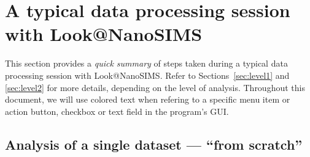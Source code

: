 \documentclass[a4paper, 11pt]{article}
\newcommand{\ttt}[1]{\texttt{#1}}
\newcommand{\lans}[1]{{\color{magenta}#1}}
\newcommand{\lanscb}[1]{{\color{darkgreen}#1}}
\newcommand{\lanstf}[1]{{\color{cyan}#1}}
\newcounter{step}
\begin{document}

\clearpage

\section{A typical data processing session with Look@NanoSIMS}

This section provides a \emph{quick summary} of steps taken during a typical data processing session with Look@NanoSIMS. Refer to Sections~\ref{sec:level1} and \ref{sec:level2} for more details, depending on the level of analysis. Throughout this document, we will use colored text when refering to a specific \lans{menu item or action button}, \lanscb{checkbox} or \lanstf{text field} in the program's GUI.


\subsection{Analysis of a single dataset --- ``from scratch''}
\label{sec:analysis_from_scratch}
\end{document}
